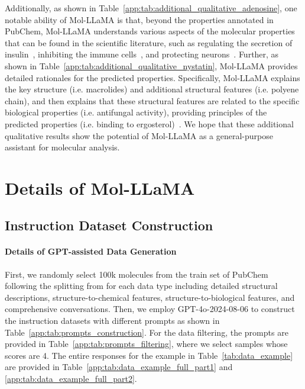 \vspace{-0.03in}
Additionally, as shown in Table~\ref{app:tab:additional_qualitative_adenosine}, one notable ability of Mol-LLaMA is that, beyond the properties annotated in PubChem, Mol-LLaMA understands various aspects of the molecular properties that can be found in the scientific literature, such as regulating the secretion of insulin~\cite{heseltine1995adenosineinsulin}, inhibiting the immune cells~\cite{wang2024adenosineimmune}, and protecting neurons~\cite{dall2003adenosineneuroprotection}. Further, as shown in Table~\ref{app:tab:additional_qualitative_nystatin}, Mol-LLaMA provides detailed rationales for the predicted properties. Specifically, Mol-LLaMA explains the key structure (i.e. macrolides) and additional structural features (i.e. polyene chain), and then explains that these structural features are related to the specific biological properties (i.e. antifungal activity), providing principles of the predicted properties (i.e. binding to ergosterol)~\cite{serhan2014polyene}. We hope that these additional qualitative results show the potential of Mol-LLaMA as a general-purpose assistant for molecular analysis.


\clearpage

\clearpage



\vspace{-0.05in}
\section{Details of Mol-LLaMA\label{app:sec:details_MolLLaMA}}
\vspace{-0.07in}
\subsection{Instruction Dataset Construction\label{app:sec:dataset_construction}}
\vspace{-0.07in}
\paragraph{Details of GPT-assisted Data Generation} First, we randomly select 100k molecules from the train set of PubChem following the splitting from \citet{li2024molm} for each data type including detailed structural descriptions, structure-to-chemical features, structure-to-biological features, and comprehensive conversations. Then, we employ GPT-4o-2024-08-06 to construct the instruction datasets with different prompts as shown in Table~\ref{app:tab:prompts_construction}. For the data filtering, the prompts are provided in Table~\ref{app:tab:prompts_filtering}, where we select samples whose scores are 4. The entire responses for the example in Table~\ref{tab:data_example} are provided in Table~\ref{app:tab:data_example_full_part1} and \ref{app:tab:data_example_full_part2}.


